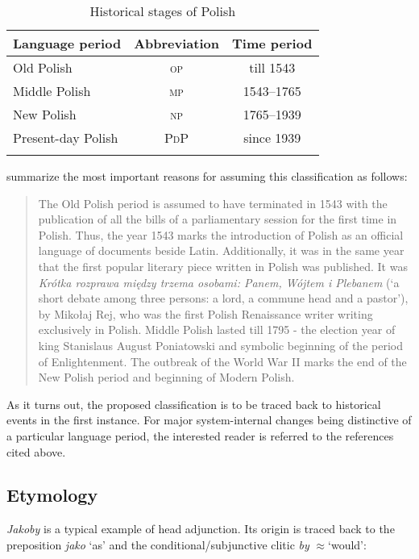 \documentclass[output=paper
,modfonts
,nonflat]{langsci/langscibook}
\begin{document}
\begin{table}[h]
\begin{tabular}{lcc} 
\lsptoprule
Language period & Abbreviation & Time period  \\
\midrule
 Old Polish & \textsc{op} & till 1543 \\
 Middle Polish & \textsc{mp} & 1543--1765  \\
 New Polish & \textsc{np} & 1765--1939 \\
 Present-day Polish & \textsc{PdP} & since 1939 \\ 
\lspbottomrule
\end{tabular}
\caption{Historical stages of Polish}
\end{table}

\noindent \textcite[823]{Dziubalska-Koaczyk-Walczak2010} summarize the most important reasons for assuming this classification as follows:

\begin{quote}
The Old Polish period is assumed to have terminated in 1543 with the publication of all the bills of a parliamentary session for the first time in Polish. Thus, the year 1543 marks the introduction of Polish as an official language of documents beside Latin. Additionally, it was in the same year that the first popular literary piece written in Polish was published. It was \emph{Krótka rozprawa między trzema osobami: Panem, Wójtem i Plebanem} (`a short debate among three persons: a lord, a commune head and a pastor'), by Mikołaj Rej, who was the first Polish Renaissance writer writing exclusively in Polish. Middle Polish lasted till 1795 - the election year of king Stanislaus August Poniatowski and symbolic beginning of the period of Enlightenment. The outbreak of the World War II marks the end of the New Polish period and beginning of Modern Polish.
\end{quote}

\noindent As it turns out, the proposed classification is to be traced back to historical events in the first instance. For major system-internal changes being distinctive of a particular language period, the interested reader is referred to the references cited above. 

\subsection{Etymology}

\emph{Jakoby} is a typical example of head adjunction. Its origin is traced back to the preposition \emph{jako} `as' and the conditional\slash subjunctive clitic \emph{by} $\approx$`would': 
\end{document}
